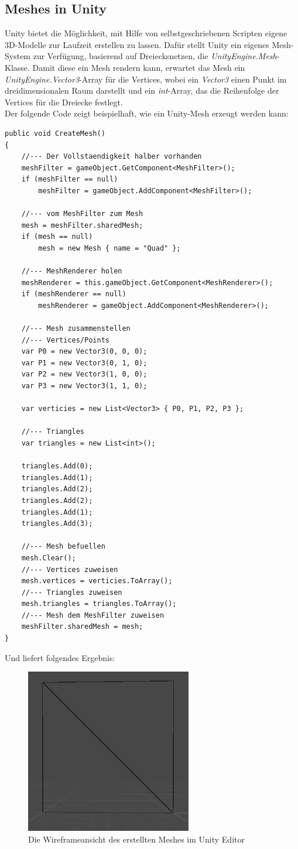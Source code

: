 \subsection{Meshes in Unity}
Unity bietet die M\"oglichkeit, mit Hilfe von selbstgeschriebenen Scripten eigene 3D-Modelle zur Laufzeit erstellen zu lassen. Daf\"ur stellt Unity ein eigenes Mesh-System zur Verf\"ugung, basierend auf Dreiecksnetzen, die \textit{UnityEngine.Mesh}-Klasse. Damit diese ein Mesh rendern kann, erwartet das Mesh ein \textit{UnityEngine.Vector3}-Array f\"ur die Vertices, wobei ein \textit{Vector3} einen Punkt im dreidimensionalen Raum darstellt und ein \textit{int}-Array, das die Reihenfolge der Vertices f\"ur die Dreiecke festlegt.   
\\
Der folgende Code zeigt beispielhaft, wie ein Unity-Mesh erzeugt werden kann:
\begin{lstlisting}
public void CreateMesh()
{
	//--- Der Vollstaendigkeit halber vorhanden
	meshFilter = gameObject.GetComponent<MeshFilter>();
	if (meshFilter == null)
		meshFilter = gameObject.AddComponent<MeshFilter>();

	//--- vom MeshFilter zum Mesh
	mesh = meshFilter.sharedMesh;
	if (mesh == null)
		mesh = new Mesh { name = "Quad" };

	//--- MeshRenderer holen
	meshRenderer = this.gameObject.GetComponent<MeshRenderer>();
	if (meshRenderer == null)
		meshRenderer = gameObject.AddComponent<MeshRenderer>();

	//--- Mesh zusammenstellen
	//--- Vertices/Points
	var P0 = new Vector3(0, 0, 0);
	var P1 = new Vector3(0, 1, 0);
	var P2 = new Vector3(1, 0, 0);
	var P3 = new Vector3(1, 1, 0);
	
	var verticies = new List<Vector3> { P0, P1, P2, P3 };

	//--- Triangles
	var triangles = new List<int>();

	triangles.Add(0);
	triangles.Add(1);
	triangles.Add(2);
	triangles.Add(2);
	triangles.Add(1);
	triangles.Add(3);

	//--- Mesh befuellen
	mesh.Clear();
	//--- Vertices zuweisen
	mesh.vertices = verticies.ToArray();
	//--- Triangles zuweisen
	mesh.triangles = triangles.ToArray();
	//--- Mesh dem MeshFilter zuweisen
	meshFilter.sharedMesh = mesh;
}
\end{lstlisting}

Und liefert folgendes Ergebnis:
\begin{figure}[h]
	\centering
	\includegraphics[width=0.35\linewidth]{Images/UnityQuadWireframe}
	\caption[Die Wireframeansicht des erstellten Meshes]{Die Wireframeansicht des erstellten Meshes im Unity Editor}
	\label{fig:unityquadwireframe}
\end{figure}

